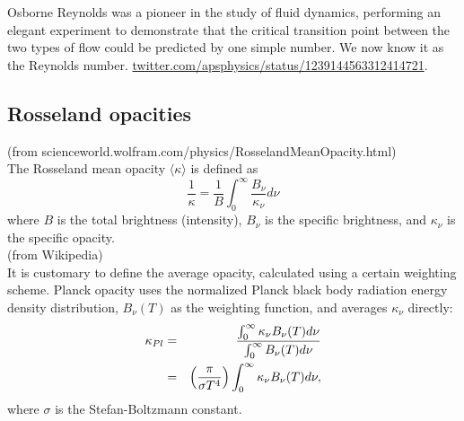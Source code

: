\documentclass[11pt]{article}
\begin{document}
{Osborne Reynolds was a pioneer in the study of fluid dynamics,
performing an elegant experiment to demonstrate that the critical
transition point between the two types of flow could be predicted by
one simple number. We now know it as the Reynolds number.
\href{https://twitter.com/apsphysics/status/1239144563312414721?}{twitter.com/apsphysics/status/1239144563312414721}.



\subsection*{Rosseland opacities}
(from scienceworld.wolfram.com/physics/RosselandMeanOpacity.html) \\   	
The Rosseland mean opacity $\langle \kappa \rangle$  is defined as
\begin{equation}
\frac{1}{\kappa} = \frac{1}{B} \int^{\infty}_{0} \frac{B_{\nu}}{\kappa_{\nu}} d\nu
\end{equation}
where $B$ is the total brightness (intensity), $B_{\nu}$ is the
specific brightness, and $\kappa_{\nu}$ is the specific opacity. \\

\noindent
(from Wikipedia) \\
It is customary to define the average opacity, calculated using a
certain weighting scheme. Planck opacity uses the normalized Planck
black body radiation energy density distribution, $B_{\nu }(T)$ as the
weighting function, and averages $\kappa _{\nu}$ directly:
\begin{eqnarray}
\kappa _{Pl} & =& {\int _{0}^{\infty }\kappa _{\nu }B_{\nu }(T)d\nu \over
                  \int _{0}^{\infty }B_{\nu }(T)d\nu } \\ 
                 & = &{\Big (}{\pi \over \sigma
                  T^{4}}{\Big )}\int _{0}^{\infty }\kappa _{\nu }B_{\nu }(T)d\nu ,
\end{eqnarray}
\noindent
where $\sigma$ is the Stefan-Boltzmann constant.\\ 

}
\end{document}
